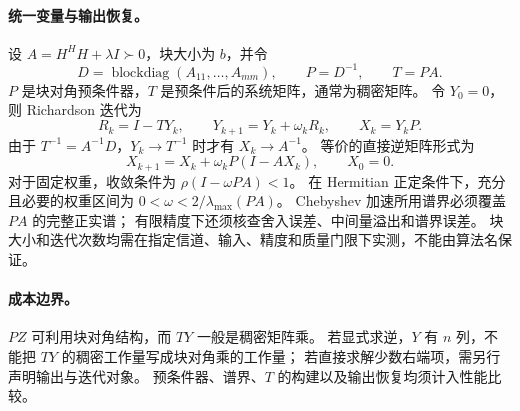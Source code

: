 \paragraph{统一变量与输出恢复。}
设 $A=H^{H}H+\lambda I\succ0$，块大小为 $b$，并令
\[
D=\operatorname{blockdiag}(A_{11},\ldots,A_{mm}),\qquad
P=D^{-1},\qquad T=PA.
\]
$P$ 是块对角预条件器，$T$ 是预条件后的系统矩阵，通常为稠密矩阵。
令 $Y_0=0$，则 Richardson 迭代为
\[
R_k=I-TY_k,\qquad Y_{k+1}=Y_k+\omega_k R_k,
\qquad X_k=Y_kP.
\]
由于 $T^{-1}=A^{-1}D$，$Y_k\to T^{-1}$ 时才有 $X_k\to A^{-1}$。
等价的直接逆矩阵形式为
\[
X_{k+1}=X_k+\omega_kP(I-AX_k),\qquad X_0=0.
\]
对于固定权重，收敛条件为 $\rho(I-\omega PA)<1$。
在 Hermitian 正定条件下，充分且必要的权重区间为
$0<\omega<2/\lambda_{\max}(PA)$。
Chebyshev 加速所用谱界必须覆盖 $PA$ 的完整正实谱；
有限精度下还须核查舍入误差、中间量溢出和谱界误差。
块大小和迭代次数均需在指定信道、输入、精度和质量门限下实测，不能由算法名保证。

\paragraph{成本边界。}
$PZ$ 可利用块对角结构，而 $TY$ 一般是稠密矩阵乘。
若显式求逆，$Y$ 有 $n$ 列，不能把 $TY$ 的稠密工作量写成块对角乘的工作量；
若直接求解少数右端项，需另行声明输出与迭代对象。
预条件器、谱界、$T$ 的构建以及输出恢复均须计入性能比较。
